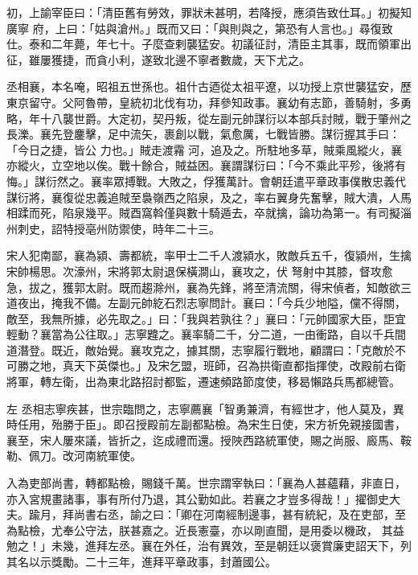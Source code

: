 \begin{pinyinscope}
 初，上諭宰臣曰：「清臣舊有勞效，罪狀未甚明，若降授，應須告致仕耳。」初擬知廣寧
 府，上曰：「姑與滄州。」既而又曰：「與則與之，第恐有人言也。」尋復致仕。泰和二年薨，年七十。子麼查剌襲猛安。初議征討，清臣主其事，既而領軍出征，雖屢獲捷，而貪小利，遂致北邊不寧者數歲，天下尤之。


丞相襄，本名唵，昭祖五世孫也。祖什古迺從太祖平遼，以功授上京世襲猛安，歷東京留守。父阿魯帶，皇統初北伐有功，拜參知政事。襄幼有志節，善騎射，多勇略，年十八襲世爵。大定初，契丹叛，從左副元帥謀衍以本部兵討賊，戰于肇州之長濼。襄先登鏖擊，足中流矢，裹創以戰，氣愈厲，七戰皆勝。謀衍握其手曰：「今日之捷，皆公
 力也。」賊走渡霿
 河，追及之。所駐地多草，賊乘風縱火，襄亦縱火，立空地以俟。戰十餘合，賊益困。襄謂謀衍曰：「今不乘此平殄，後將有悔。」謀衍然之。襄率眾搏戰。大敗之，俘獲萬計。會朝廷遣平章政事僕散忠義代謀衍將，襄復從忠義追賊至裊嶺西之陷泉，及之，率右翼身先奮擊，賊大潰，人馬相蹂而死，陷泉幾平。賊酉窩斡僅與數十騎遁去，卒就擒，論功為第一。有司擬淄州刺史，詔特授亳州防禦使，時年二十三。



 宋人犯南鄙，襄為潁、壽都統，率甲士二千人渡潁水，敗敵兵五千，復潁州，生擒宋帥楊思。次濠州，宋將郭太尉退保橫澗山，襄攻之，伏
 弩射中其膝，督攻愈急，拔之，獲郭太尉。既而趨滁州，襄為先鋒，將至清流關，得宋偵者，知敵欲三道夜出，掩我不備。左副元帥紇石烈志寧問計。襄曰：「今兵少地隘，儻不得關，敵至，我無所據，必先取之。」曰：「我與若孰往？」襄曰：「元帥國家大臣，詎宜輕動？襄當為公往取。」志寧韙之。襄率騎二千，分二道，一由衝路，自以千兵間道潛登。既近，敵始覺。襄攻克之，據其關，志寧履行戰地，顧謂曰：「克敵於不可勝之地，真天下英傑也。」及宋乞盟，班師，召為拱衛直都指揮使，改殿前右衛將軍，轉左衛，出為東北路招討都監，遷速頻路節度使，移曷懶路兵馬都總管。



 左
 丞相志寧疾甚，世宗臨問之，志寧薦襄「智勇兼濟，有經世才，他人莫及，異時任用，殆勝于臣」。即召授殿前左副都點檢。為宋生日使，宋方祈免親接國書，襄至，宋人屢來議，皆折之，迄成禮而還。授陜西路統軍使，賜之尚服、廄馬、鞍勒、佩刀。改河南統軍使。



 入為吏部尚書，轉都點檢，賜錢千萬。世宗謂宰執曰：「襄為人甚蘊藉，非直日，亦入宮規畫諸事，事有所付乃退，其公勤如此。若襄之才豈多得哉！」擢御史大夫。踰月，拜尚書右丞，諭之曰：「卿在河南經制邊事，甚有統紀，及在吏部，至為點檢，尤奉公守法，朕甚嘉之。近長憲臺，亦以剛直聞，是用委以機政，
 其益勉之！」未幾，進拜左丞。襄在外任，治有異效，至是朝廷以褒賞廉吏詔天下，列其名以示獎勵。二十三年，進拜平章政事，封蕭國公。




\end{pinyinscope}
